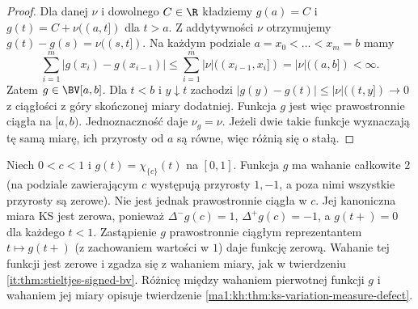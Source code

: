 \begin{proof}
Dla danej $\nu$ i dowolnego $C\in\R$ kładziemy
$g(a)=C$ i $g(t)=C+\nu((a,t])$ dla $t>a$.
Z addytywności $\nu$ otrzymujemy
$g(t)-g(s)=\nu((s,t])$. Na każdym podziale
$a=x_0<\dots<x_m=b$ mamy
\[
 \sum_{i=1}^m|g(x_i)-g(x_{i-1})|
 \le\sum_{i=1}^m|\nu|((x_{i-1},x_i])
 =|\nu|((a,b])<\infty.
\]
Zatem $g\in\BV[a,b]$.
Dla $t<b$ i $y\downarrow t$ zachodzi
$|g(y)-g(t)|\le|\nu|((t,y])\to0$
z ciągłości z góry skończonej miary dodatniej.
Funkcja $g$ jest więc prawostronnie ciągła na $[a,b)$.
Jednoznaczność daje $\nu_g=\nu$. Jeżeli dwie takie
funkcje wyznaczają tę samą miarę, ich przyrosty
od $a$ są równe, więc różnią się o stałą.
\end{proof}

\begin{przyklad}
\label{it:ex:stieltjes-signed-point}
Niech $0<c<1$ i $g(t)=\chi_{\{c\}}(t)$ na $[0,1]$.
Funkcja $g$ ma wahanie całkowite $2$ (na podziale
zawierającym $c$ występują przyrosty $1,-1$,
a poza nimi wszystkie przyrosty są zerowe).
Nie jest jednak prawostronnie ciągła w $c$.
Jej kanoniczna miara KS jest zerowa, ponieważ
$\Delta^-g(c)=1$, $\Delta^+g(c)=-1$,
a $g(t+)=0$ dla każdego $t<1$.
Zastąpienie $g$ prawostronnie ciągłym reprezentantem
$t\mapsto g(t+)$ (z zachowaniem wartości w $1$)
daje funkcję zerową. Wahanie tej funkcji jest zerowe
i zgadza się z wahaniem miary, jak w twierdzeniu
\ref{it:thm:stieltjes-signed-bv}.
Różnicę między wahaniem pierwotnej funkcji $g$
i wahaniem jej miary opisuje twierdzenie
\ref{ma1:kh:thm:ks-variation-measure-defect}.
\end{przyklad}

